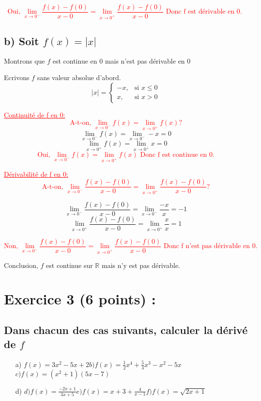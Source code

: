 \documentclass[12pt]{article}
\begin{document}
\textcolor{red}{\[\text{Oui, } \lim_{x \to 0^{-}}\frac{f(x)-f(0)}{x-0}=\lim_{x \to 0^{+}}\frac{f(x)-f(0)}{x-0}\text{ Donc f est dérivable en 0. }\]}
\subsection*{b) Soit $f(x)=|x|$ }
Montrons que $f$ est continue en 0 mais n'est pas dérivable en 0

Ecrivons $f$ sans valeur absolue d'abord.
\[ |x| = \begin{cases} 
  -x, & \text{si } x \leq 0 \\
  x, & \text{si } x > 0 
\end{cases} \]

\textcolor{red}{\underline{Continuité de f en 0:}}
\textcolor{red}{\[\text{A-t-on, } \lim_{x \to 0^{-}}f(x)=\lim_{x \to 0^{+}}f(x) ?\]}
\[\lim_{x \to 0^{-}}f(x)=\lim_{x \to 0^{-}}-x=0\]
\[\lim_{x \to 0^{+}}f(x)=\lim_{x \to 0^{+}}x=0\]
\textcolor{red}{\[\text{Oui, } \lim_{x \to 0^{-}}f(x)=\lim_{x \to 0^{+}}f(x)\text{ Donc f est continue en 0.}\]}

\textcolor{red}{\underline{Dérivabilité de f en 0:}}
\textcolor{red}{\[\text{A-t-on, } \lim_{x \to 0^{-}}\frac{f(x)-f(0)}{x-0}=\lim_{x \to 0^{+}}\frac{f(x)-f(0)}{x-0}?\]}

\[\lim_{x \to 0^{-}}\frac{f(x)-f(0)}{x-0}=\lim_{x \to 0^{-}}\frac{-x}{x}=-1\]
\[\lim_{x \to 0^{+}}\frac{f(x)-f(0)}{x-0}=\lim_{x \to 0^{+}}\frac{x}{x}=1\]

\textcolor{red}{\[\text{Non, } \lim_{x \to 0^{-}}\frac{f(x)-f(0)}{x-0}=\lim_{x \to 0^{+}}\frac{f(x)-f(0)}{x-0}\text{ Donc f n'est  pas dérivable en 0. }\]}

Conclusion, $f$ est continue sur $\mathbb{R}$ mais n'y est pas dérivable.
\section*{Exercice 3 (6 points) :}
\subsection*{ Dans chacun des cas suivants, calculer la dérivé de $f$}
\begin{itemize}
\item[a)]$f(x)=3x^{2}-5x+2$\quad\quad $b)f(x)=\frac{1}{2}x^{4}+\frac{5}{3}x^{3}-x^{2}-5x$\quad\quad $c)f(x)=(x^{2}+1)(5x-7)$
\item[d)]$d)f(x)=\frac{-2x+1}{3x+5}$\quad\quad $e)f(x)=x+3+\frac{4}{x-1}$\quad\quad $f)f(x)=\sqrt{2x+1}$
\end{itemize}
\end{document}
